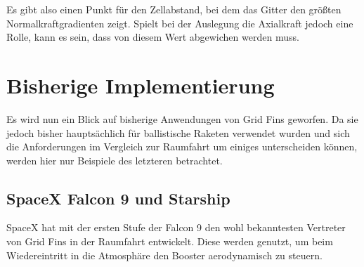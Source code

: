 Es gibt also einen Punkt für den Zellabstand, bei dem das Gitter den größten Normalkraftgradienten zeigt. Spielt bei der Auslegung die Axialkraft jedoch eine Rolle, kann es sein, dass von diesem Wert abgewichen werden muss.

\section{Bisherige Implementierung}
Es wird nun ein Blick auf bisherige Anwendungen von Grid Fins geworfen. Da sie jedoch bisher hauptsächlich für ballistische Raketen verwendet wurden und sich die Anforderungen im Vergleich zur Raumfahrt um einiges unterscheiden können, werden hier nur Beispiele des letzteren betrachtet.
\subsection{SpaceX Falcon 9 und Starship}
SpaceX hat mit der ersten Stufe der Falcon 9 den wohl bekanntesten Vertreter von Grid Fins in der Raumfahrt entwickelt. Diese werden genutzt, um beim Wiedereintritt in die Atmosphäre den Booster aerodynamisch zu steuern. 


